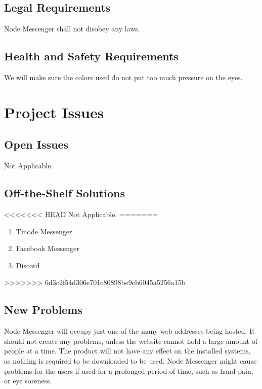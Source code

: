 \documentclass[12pt, titlepage]{article}
\begin{document}
	    \subsection{Legal Requirements}
		Node Messenger shall not disobey any laws.
    	\subsection{Health and Safety Requirements}
		We will make sure the colors used do not put too much pressure on the eyes. 
	
	\newpage
    \section{Project Issues}

    	\subsection{Open Issues}
    	Not Applicable.

    	\subsection{Off-the-Shelf Solutions}
<<<<<<< HEAD
    	Not Applicable.
=======
    	\begin{enumerate}
    	    \item Tinode Messenger
    	    \item Facebook Messenger
    	    \item Discord
    	\end{enumerate}
>>>>>>> 6d3c2f54d306e701e80898be9eb6045a5256a15b

    	\subsection{New Problems}
    	Node Messenger will occupy just one of the many web addresses being hosted. It should not create any problems, unless the website cannot hold a large amount of people at a time. The product will not have any effect on the installed systems, as nothing is required to be downloaded to be used. Node Messenger might cause problems for the users if used for a prolonged period of time, such as hand pain, or eye soreness. 
\end{document}
